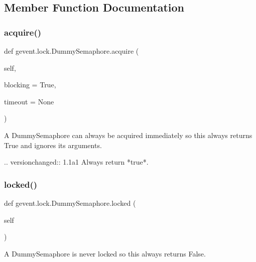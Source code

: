 \subsection{Member Function Documentation}
\mbox{\label{classgevent_1_1lock_1_1_dummy_semaphore_a2ec96f58e8df31411309513bb138dcc8}} 
\subsubsection{\texorpdfstring{acquire()}{acquire()}}
{\footnotesize\ttfamily def gevent.\+lock.\+Dummy\+Semaphore.\+acquire (\begin{DoxyParamCaption}\item[{}]{self,  }\item[{}]{blocking = {\ttfamily True},  }\item[{}]{timeout = {\ttfamily None} }\end{DoxyParamCaption})}

\begin{DoxyVerb}A DummySemaphore can always be acquired immediately so this always
returns True and ignores its arguments.

.. versionchanged:: 1.1a1
   Always return *true*.
\end{DoxyVerb}
 \mbox{\label{classgevent_1_1lock_1_1_dummy_semaphore_a32e9f4bb478d89bdc923aa32f334f88d}} 
\subsubsection{\texorpdfstring{locked()}{locked()}}
{\footnotesize\ttfamily def gevent.\+lock.\+Dummy\+Semaphore.\+locked (\begin{DoxyParamCaption}\item[{}]{self }\end{DoxyParamCaption})}

\begin{DoxyVerb}A DummySemaphore is never locked so this always returns False.\end{DoxyVerb}
 \mbox{\label{classgevent_1_1lock_1_1_dummy_semaphore_a29fb584a77690e528fc92764d990bf3d}} 

